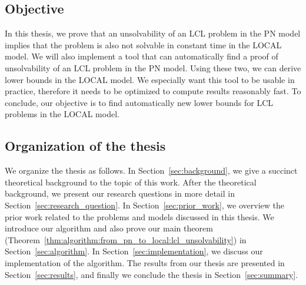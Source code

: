 \subsection{Objective}
In this thesis, we prove that an unsolvability of an LCL problem in the PN model implies that the problem is also not solvable in constant time in the LOCAL model.
We will also implement a tool that can automatically find a proof of unsolvability of an LCL problem in the PN model.
Using these two, we can derive lower bounds in the LOCAL model.
We especially want this tool to be usable in practice, therefore it needs to be optimized to compute results reasonably fast.
To conclude, our objective is to find automatically new lower bounds for LCL problems in the LOCAL model.

\subsection{Organization of the thesis}
We organize the thesis as follows.
In Section~\ref{sec:background}, we give a succinct theoretical background to the topic of this work.
After the theoretical background, we present our research questions in more detail in Section~\ref{sec:research_question}.
In Section~\ref{sec:prior_work}, we overview the prior work related to the problems and models discussed in this thesis.
We introduce our algorithm and also prove our main theorem (Theorem~\ref{thm:algorithm:from_pn_to_local:lcl_unsolvability}) in Section~\ref{sec:algorithm}.
In Section~\ref{sec:implementation}, we discuss our implementation of the algorithm.
The results from our thesis are presented in Section~\ref{sec:results}, and finally we conclude the thesis in Section~\ref{sec:summary}.
